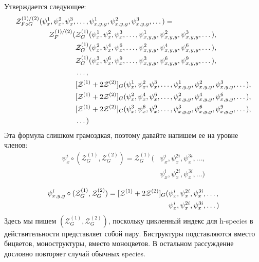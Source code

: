 Утверждается следующее:
\begin{equation}
\begin{split}
\label{eq:h-zfg}
	\mathcal Z^{(1)/(2)}_{F \circ G} (\psi_x^1, \psi_x^2, \psi_x^3, &\dots, 
	\psi_{x,y,y}^1, \psi_{x,y,y}^2, \psi_{x,y,y}^3, \dots) = \\
	\mathcal Z_F^{(1)/(2)}(
		&\mathcal Z^{(1)}_G(\psi_x^1, \psi_x^2, \psi_x^3, \dots, 
					 \psi_{x, y, y}^1, \psi_{x, y, y}^2, \psi_{x, y, y}^3, \dots), \\
		&\mathcal Z^{(1)}_G(\psi_x^2, \psi_x^4, \psi_x^6, \dots, 
					 \psi_{x, y, y}^2, \psi_{x, y, y}^4, \psi_{x, y, y}^6, \dots), \\
		&\mathcal Z^{(1)}_G(\psi_x^3, \psi_x^6, \psi_x^9, \dots, 
					 \psi_{x, y, y}^3, \psi_{x, y, y}^6, \psi_{x, y, y}^9, \dots), \\
		&\dots, \\
		&[\mathcal Z^{(1)} + 2\mathcal Z^{(2)}]_G(\psi_x^1, \psi_x^2, \psi_x^3, \dots, 
					 \psi_{x,y,y}^1, \psi_{x,y,y}^2, \psi_{x,y,y}^3, \dots), \\
		&[\mathcal Z^{(1)} + 2\mathcal Z^{(2)}]_G(\psi_x^2, \psi_x^4, \psi_x^6, \dots, 
					 \psi_{x,y,y}^2, \psi_{x,y,y}^4, \psi_{x,y,y}^6, \dots), \\
		&[\mathcal Z^{(1)} + 2\mathcal Z^{(2)}]_G(\psi_x^3, \psi_x^6, \psi_x^9, \dots, 
					 \psi_{x,y,y}^3, \psi_{x,y,y}^6, \psi_{x,y,y}^9, \dots), \\
		&\dots
	)
\end{split}	
\end{equation}
Эта формула слишком грамоздкая, поэтому давайте напишем ее на уровне членов:
\begin{equation*}
\begin{split}
\psi_x^i \circ (\mathcal Z^{(1)}_G, \mathcal Z^{(2)}_G ) = \mathcal Z^{(1)}_G
(&\psi_x^i, \psi_x^{2i}, \psi_x^{3i}, \dots, \\
&\psi_x^i, \psi_x^{2i}, \psi_x^{3i}, \dots)
\end{split}
\end{equation*}

\begin{equation*}
\begin{split}
\psi_{x,y,y}^i \circ (\mathcal Z^{(1)}_G, \mathcal Z^{(2)}_G ) = [\mathcal Z^{(1)} + 2\mathcal Z^{(2)}]_G
(&\psi_x^i, \psi_x^{2i}, \psi_x^{3i}, \dots, \\
&\psi_x^i, \psi_x^{2i}, \psi_x^{3i}, \dots)
\end{split}
\end{equation*}
Здесь мы пишем $(\mathcal Z^{(1)}_G, \mathcal Z^{(2)}_G )$, поскольку
цикленный индекс для h-species в действительности представляет собой пару.
Биструктуры подставляются вместо бицветов, моноструктуры, вместо моноцветов. В
остальном рассуждение дословно повторяет случай обычных species.

